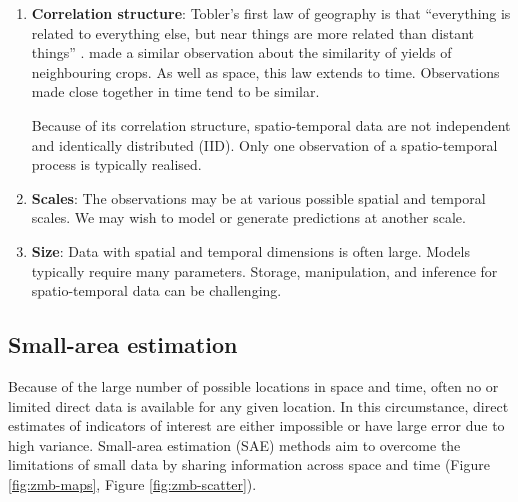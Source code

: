 \documentclass[a4paper, nobind]{templates/ociamthesis}
\begin{document}
\begin{enumerate}
\def\labelenumi{\arabic{enumi}.}
\item
  \textbf{Correlation structure}:
  Tobler's first law of geography is that ``everything is related to everything else, but near things are more related than distant things'' \autocite{tobler1970computer}.
  \textcite{fisher1936design} made a similar observation about the similarity of yields of neighbouring crops.
  As well as space, this law extends to time.
  Observations made close together in time tend to be similar.

  Because of its correlation structure, spatio-temporal data are not independent and identically distributed (IID).
  Only one observation of a spatio-temporal process is typically realised.
\item
  \textbf{Scales}:
  The observations may be at various possible spatial and temporal scales.
  We may wish to model or generate predictions at another scale.
\item
  \textbf{Size}:
  Data with spatial and temporal dimensions is often large.
  Models typically require many parameters.
  Storage, manipulation, and inference for spatio-temporal data can be challenging.
\end{enumerate}

\hypertarget{small-area-estimation}{%
\subsection{Small-area estimation}\label{small-area-estimation}}

Because of the large number of possible locations in space and time, often no or limited direct data is available for any given location.
In this circumstance, direct estimates of indicators of interest are either impossible or have large error due to high variance.
Small-area estimation (SAE) methods aim to overcome the limitations of small data by sharing information across space and time (Figure \ref{fig:zmb-maps}, Figure \ref{fig:zmb-scatter}).
\end{document}
